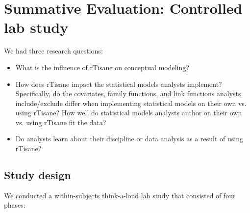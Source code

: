\section{Summative Evaluation: Controlled lab study} \label{sec:summativeEval}

We had three research questions:

\begin{itemize}
    \item \evalConceptualModels What is the influence of rTisane on conceptual
    modeling?
    \item \evalStatisticalModels How does rTisane impact the statistical models
    analysts implement? Specifically, do the covariates, family functions, and
    link functions analysts include/exclude differ when implementing statistical
    models on their own vs. using rTisane? How well do statistical models
    analysts author on their own vs. using rTisane fit the data?  
    \item \evalLearning Do analysts learn about their discipline or data
    analysis as a result of using rTisane?
\end{itemize}

\subsection{Study design}
We conducted a within-subjects think-a-loud lab study that consisted of four phases: 


